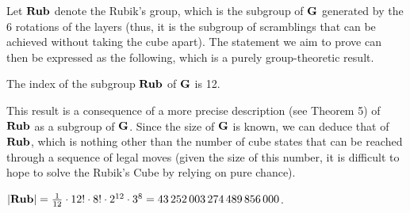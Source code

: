 Let $\mathbf{Rub}$ denote the Rubik's group, which is the subgroup of $\mathbf{G}$ generated by the 6 rotations of the layers (thus, it is the subgroup of scramblings that can be achieved without taking the cube apart). The statement we aim to prove can then be expressed as the following, which is a purely group-theoretic result.

\begin{theorem}
    \label{thm:index}
    The index of the subgroup $\mathbf{Rub}$ of $\mathbf{G}$ is 12.
\end{theorem}

This result is a consequence of a more precise description (see Theorem 5) of $\mathbf{Rub}$ as a subgroup of $\mathbf{G}$. Since the size of $\mathbf{G}$ is known, we can deduce that of $\mathbf{Rub}$, which is nothing other than the number of cube states that can be reached through a sequence of legal moves (given the size of this number, it is difficult to hope to solve the Rubik's Cube by relying on pure chance).

\begin{corollary}
    $|\mathbf{Rub}| = \frac{1}{12} \cdot 12! \cdot 8! \cdot 2^{12} \cdot 3^8 = 43\,252\,003\,274\,489\,856\,000$.
\end{corollary}
